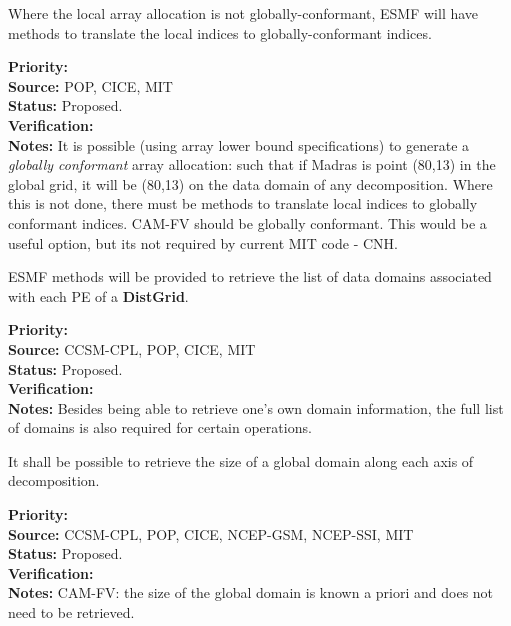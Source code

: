 
Where the local array allocation is not globally-conformant, 
ESMF will have methods to translate the local indices to
globally-conformant indices.

\begin{reqlist}
{\bf Priority:} \\
{\bf Source:} POP, CICE, MIT \\
{\bf Status:} Proposed. \\
{\bf Verification:} \\
{\bf Notes:} It is possible (using array lower bound specifications)
  to generate a \emph{globally conformant} array allocation: such that
  if Madras is point (80,13) in the global grid, it will be (80,13) on
  the data domain of any decomposition. Where this is not done, there
  must be methods to translate local indices to globally conformant
  indices.  CAM-FV should be globally conformant. 
  This would be a useful option, but its not
  required by current MIT code - CNH.
\end{reqlist}


ESMF methods will be provided to retrieve the list of data
domains associated with each PE of a  \textbf{DistGrid}.

\begin{reqlist}
{\bf Priority:} \\
{\bf Source:} CCSM-CPL, POP, CICE, MIT \\
{\bf Status:} Proposed. \\
{\bf Verification:} \\
{\bf Notes:} Besides being able to retrieve one's own domain
  information, the full list of domains is also required for certain
  operations.
\end{reqlist}



It shall be possible to retrieve the size of a global domain
along each axis of decomposition.

\begin{reqlist}
{\bf Priority:} \\
{\bf Source:} CCSM-CPL, POP, CICE, NCEP-GSM, NCEP-SSI, MIT \\
{\bf Status:} Proposed. \\
{\bf Verification:} \\
{\bf Notes:} CAM-FV: the size of the global domain is known
a priori and does not need to be retrieved.
\end{reqlist}

